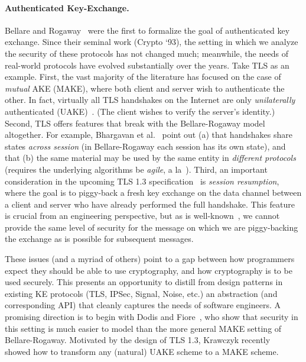 \paragraph{Authenticated Key-Exchange. } 
    Bellare and Rogaway~\cite{bellare1993entity} were the first to formalize the
    goal of authenticated key exchange. Since their seminal work (Crypto `93),
    the setting in which we analyze the security of these protocols has not
    changed much; meanwhile, the needs of real-world protocols have evolved
    substantially over the years. Take TLS as an example.
    First, the vast majority of the literature has focused on the case of
    \emph{mutual} AKE (MAKE), where both client and server wish to authenticate the
    other. In fact, virtually all TLS handshakes on the Internet are only
    \emph{unilaterally} authenticated (UAKE)~\cite{xxx}. (The client
    wishes to verify the server's identity.)
    Second, TLS offers features that break with the Bellare-Rogaway model
    altogether. For example, Bhargavan et al.~\cite{bhargavan2014proving} point
    out (a) that handshakes share states \emph{across session} (in
    Bellare-Rogaway each session has its own state), and that (b) the same
    material may be used by the same entity in \emph{different protocols}
    (requires the underlying algorithms be \emph{agile}, a
    la~\cite{acar2010cryptographic}).
    Third, an important consideration in the upcoming TLS 1.3
    specification~\cite{tls13} is \emph{session resumption}, where the goal is
    to piggy-back a fresh key exchange on the data channel between a client and
    server who have already performed the full handshake. This feature is
    crucial from an engineering perspective, but as is well-known~\cite{xxx}, we
    cannot provide the same level of security for the message on which we are
    piggy-backing the exchange as is possible for subsequent messages.

    These issues (and a myriad of others) point to a gap between how programmers
    expect they should be able to use cryptography, and how cryptography
    is to be used securely. This presents an opportunity to distill from design
    patterns in existing KE protocols (TLS, IPSec, Signal, Noise, etc.) an
    abstraction (and corresponding API) that cleanly captures the needs of
    software engineers.
    A promising direction is to begin with Dodis and
    Fiore~\cite{dodis2017unilateral}, who show that security in this setting is
    much easier to model than the more general MAKE setting of Bellare-Rogaway.
    Motivated by the design of TLS 1.3, Krawczyk
    recently~\cite{krawczyk2016unilateral-to-mutual} showed how to transform any
    (natural) UAKE scheme to a MAKE scheme.

\begin{task}
\end{task}
